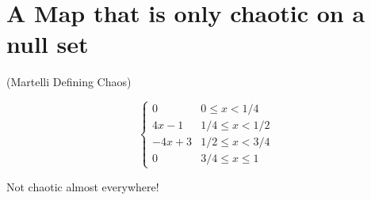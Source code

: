 \documentclass[11pt]{book}
\begin{document}
\section{A Map that is only chaotic on a null set}
(Martelli Defining Chaos)
 
\begin{equation*}
  \begin{cases}
    0 &0\leq x < 1/4 \\
    4x - 1 &1/4 \leq x < 1/2 \\
    -4x + 3 &1/2 \leq x < 3/4 \\
    0 &3/4 \leq x \leq 1
  \end{cases}
\end{equation*}

Not chaotic almost everywhere!
\end{document}

